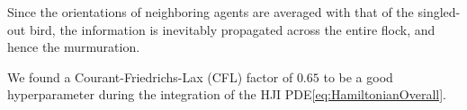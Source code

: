 Since the orientations of neighboring agents are averaged with that of the singled-out bird, the information is inevitably propagated across the entire flock, and hence the murmuration.
%

We found a Courant-Friedrichs-Lax (CFL) factor of $0.65$ to be a good hyperparameter during the integration of the HJI PDE\eqref{eq:HamiltonianOverall}.